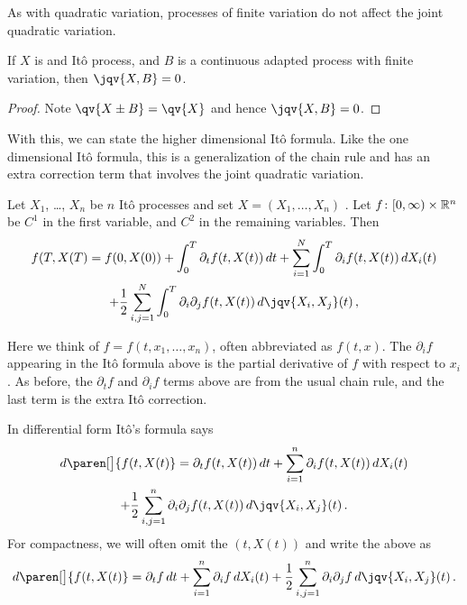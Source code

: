 As with quadratic variation, processes of finite variation do not affect the joint quadratic variation.
\begin{proposition}
  If $X$ is and It\^o process, and $B$ is a continuous adapted process with finite variation, then $\jqv{X,B} = 0$.
\end{proposition}
\begin{proof}
  Note $\qv{X\pm B} = \qv{X}$ and hence $\jqv{X, B} = 0$.
\end{proof}

With this, we can state the higher dimensional It\^o formula.
Like the one dimensional It\^o formula, this is a generalization of the chain rule and has an extra correction term that involves the joint quadratic variation.

\begin{theorem}
  Let $X_1$, \dots, $X_n$ be $n$ It\^o processes and set $X = (X_1, \dots, X_n)$ .
  Let $f\colon [0, \infty)\times \mathbb{R}^n$ be $C^1$ in the first variable, and $C^2$ in the remaining variables.
  Then
  \begin{multline*}
    f(T, X(T)
      = f(0, X(0))
	+ \int_0^T \partial_t f(t, X(t)) \, dt 
	+ \sum_{i=1}^{N} \int_0^T \partial_i f(t, X(t)) \, dX_i(t)
    \\
	+ \frac{1}{2} \sum_{i,j=1}^N \int_0^T \partial_i \partial_j f(t, X(t)) \, d\jqv{X_i, X_j}(t)\,,
  \end{multline*}
\end{theorem}
\begin{remark}
  Here we think of $f = f(t, x_1, \dots, x_n)$, often abbreviated as $f(t, x)$.
  The $\partial_i f$ appearing in the It\^o formula above is the partial derivative of $f$ with respect to $x_i$.
  As before, the $\partial_t f$ and $\partial_i f$ terms above are from the usual chain rule, and the last term is the extra It\^o correction.
\end{remark}
\begin{remark}
  In differential form It\^o's formula says
  \begin{multline*}
    d\paren[\big]{ f(t, X(t)}
      = \partial_t f(t, X(t)) \, dt 
	+ \sum_{i=1}^{n} \partial_i f(t, X(t)) \, dX_i(t)
    \\
	+ \frac{1}{2} \sum_{i,j = 1}^n
	  \partial_i \partial_j f(t, X(t)) \, d\jqv{X_i, X_j}(t)\,.
  \end{multline*}
  For compactness, we will often omit the $(t, X(t))$ and write the above as
  \begin{equation*}
    d\paren[\big]{ f(t, X(t)}
      = \partial_t f \, dt 
	+ \sum_{i=1}^{n} \partial_i f \, dX_i(t)
	+ \frac{1}{2} \sum_{i,j=1}^{n}\partial_i \partial_j f \, d\jqv{X_i, X_j}(t)\,.
  \end{equation*}
\end{remark}
